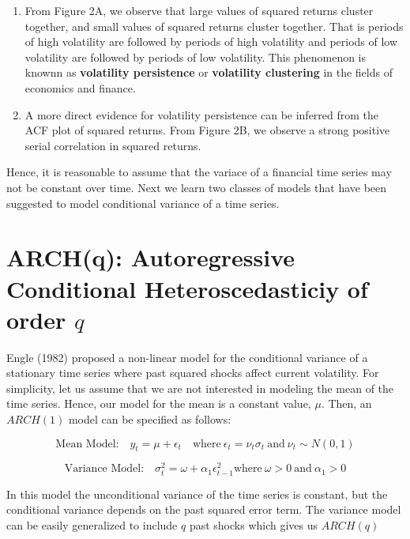 \documentclass[]{book}
\theoremstyle{definition}
\theoremstyle{definition}
\theoremstyle{definition}
\theoremstyle{remark}
\begin{document}
\begin{enumerate}
\def\labelenumi{\arabic{enumi}.}
\item
  From Figure 2A, we observe that large values of squared returns
  cluster together, and small values of squared returns cluster
  together. That is periods of high volatility are followed by periods
  of high volatility and periods of low volatility are followed by
  periods of low volatility. This phenomenon is knownn as
  \textbf{volatility persistence} or \textbf{volatility clustering} in
  the fields of economics and finance.
\item
  A more direct evidence for volatility persistence can be inferred from
  the ACF plot of squared returns. From Figure 2B, we observe a strong
  positive serial correlation in squared returns.
\end{enumerate}

Hence, it is reasonable to assume that the variace of a financial time
series may not be constant over time. Next we learn two classes of
models that have been suggested to model conditional variance of a time
series.

\hypertarget{archq-autoregressive-conditional-heteroscedasticiy-of-order-q}{%
\section{\texorpdfstring{ARCH(q): Autoregressive Conditional
Heteroscedasticiy of order
\(q\)}{ARCH(q): Autoregressive Conditional Heteroscedasticiy of order q}}\label{archq-autoregressive-conditional-heteroscedasticiy-of-order-q}}

Engle (1982) proposed a non-linear model for the conditional variance of
a stationary time series where past squared shocks affect current
volatility. For simplicity, let us assume that we are not interested in
modeling the mean of the time series. Hence, our model for the mean is a
constant value, \(\mu\). Then, an \(ARCH(1)\) model can be specified as
follows:

\[\text{Mean Model:} \quad y_t = \mu +\epsilon_t \quad \text{where} \ \epsilon_t=\nu_t  \sigma_t \ \text{and} \ \nu_t\sim N(0,1)\]

\[\text{Variance Model:} \quad  \sigma_t^2=\omega +\alpha_1 \epsilon_{t-1}^2 \text{where} \ \omega>0 \ \text{and} \ \alpha_1>0 \]

In this model the unconditional variance of the time series is constant,
but the conditional variance depends on the past squared error term. The
variance model can be easily generalized to include \(q\) past shocks
which gives us \(ARCH(q)\)
\end{document}
